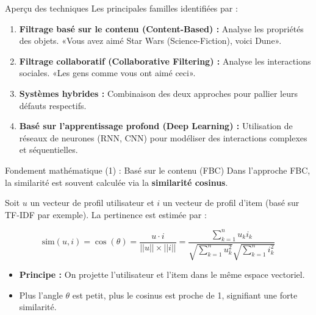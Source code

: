 \documentclass[9pt, aspectratio=169]{beamer}
\begin{document}
\begin{frame}{Aperçu des techniques}
    Les principales familles identifiées par \textcite{Ko2022} :
    \begin{enumerate}
        \item \textbf{Filtrage basé sur le contenu (Content-Based) :} Analyse les propriétés des objets. «Vous avez aimé Star Wars (Science-Fiction), voici Dune».
        \item \textbf{Filtrage collaboratif (Collaborative Filtering) :} Analyse les interactions sociales. «Les gens comme vous ont aimé ceci».
        \item \textbf{Systèmes hybrides :} Combinaison des deux approches pour pallier leurs défauts respectifs.
        \item \textbf{Basé sur l'apprentissage profond (Deep Learning) :} Utilisation de réseaux de neurones (RNN, CNN) pour modéliser des interactions complexes et séquentielles.
    \end{enumerate}
\end{frame}

\begin{frame}{Fondement mathématique (1) : Basé sur le contenu (FBC)}
    Dans l'approche FBC, la similarité est souvent calculée via la \textbf{similarité cosinus}.
    
    Soit \(u\) un vecteur de profil utilisateur et \(i\) un vecteur de profil d'item (basé sur TF-IDF par exemple). La pertinence est estimée par :
    
    \begin{equation}
        \text{sim}(u, i) = \cos(\theta) = \frac{u \cdot i}{||u|| \times ||i||} = \frac{\sum_{k=1}^{n} u_k i_k}{\sqrt{\sum_{k=1}^{n} u_k^2} \sqrt{\sum_{k=1}^{n} i_k^2}}
    \end{equation}
    
    \begin{itemize}
        \item \textbf{Principe :} On projette l'utilisateur et l'item dans le même espace vectoriel.
        \item Plus l'angle \(\theta\) est petit, plus le cosinus est proche de 1, signifiant une forte similarité.
    \end{itemize}
\end{frame}
\end{document}
